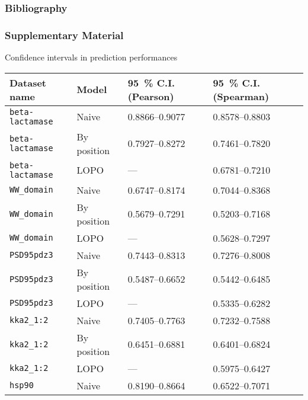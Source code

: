 \documentclass[10pt, british]{beamer}
\begin{document}
\appendix%
\begin{frame}[allowframebreaks]
	\frametitle{Bibliography}
	\printbibliography{}%
\end{frame}

\begin{frame}
	\frametitle{Supplementary Material}
	Confidence intervals in prediction performances
	\vfill%
	\tiny%
	\begin{tabular*}{\linewidth}{@{\extracolsep{\fill}}llll}%
		\toprule
		Dataset name            & Model       & \SI{95}{\percent} C.I. (Pearson) & \SI{95}{\percent} C.I. (Spearman) \\
		\midrule
		\texttt{beta-lactamase} & Naive       & \numrange{0.8866}{0.9077}        & \numrange{0.8578}{0.8803}         \\
		\texttt{beta-lactamase} & By position & \numrange{0.7927}{0.8272}        & \numrange{0.7461}{0.7820}         \\
		\texttt{beta-lactamase} & LOPO        & ---                              & \numrange{0.6781}{0.7210}         \\
		\texttt{WW\_domain}     & Naive       & \numrange{0.6747}{0.8174}        & \numrange{0.7044}{0.8368}         \\
		\texttt{WW\_domain}     & By position & \numrange{0.5679}{0.7291}        & \numrange{0.5203}{0.7168}         \\
		\texttt{WW\_domain}     & LOPO        & ---                              & \numrange{0.5628}{0.7297}         \\
		\texttt{PSD95pdz3}      & Naive       & \numrange{0.7443}{0.8313}        & \numrange{0.7276}{0.8008}         \\
		\texttt{PSD95pdz3}      & By position & \numrange{0.5487}{0.6652}        & \numrange{0.5442}{0.6485}         \\
		\texttt{PSD95pdz3}      & LOPO        & ---                              & \numrange{0.5335}{0.6282}         \\
		\texttt{kka2\_1:2}      & Naive       & \numrange{0.7405}{0.7763}        & \numrange{0.7232}{0.7588}         \\
		\texttt{kka2\_1:2}      & By position & \numrange{0.6451}{0.6881}        & \numrange{0.6401}{0.6824}         \\
		\texttt{kka2\_1:2}      & LOPO        & ---                              & \numrange{0.5975}{0.6427}         \\
		\texttt{hsp90}          & Naive       & \numrange{0.8190}{0.8664}        & \numrange{0.6522}{0.7071}         \\

\end{tabular*}
\end{frame}
\end{document}
